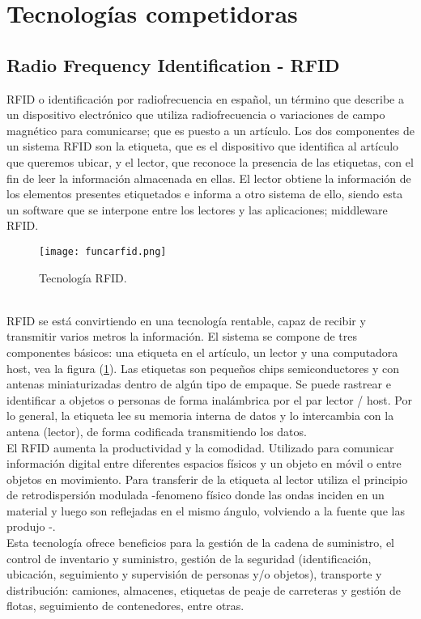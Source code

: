 \section{Tecnologías competidoras}

\subsection{Radio Frequency Identification - RFID}
RFID o identificación por radiofrecuencia en español, un término que describe a un dispositivo electrónico que utiliza radiofrecuencia o variaciones de campo magnético para comunicarse; que es puesto a un artículo. Los dos componentes de un sistema RFID son la etiqueta, que es el dispositivo que identifica al artículo que queremos ubicar, y el lector, que reconoce la presencia de las etiquetas,  con el fin de leer la información almacenada en ellas.
El lector obtiene la información de los elementos presentes etiquetados e informa a otro sistema de ello, siendo esta un software que se interpone entre los lectores y las aplicaciones;  middleware RFID. \cite{2006_BillGlover_BOOK}
\begin{figure} 	
	\centering
	\texttt{[image: funcarfid.png]}
	\caption{Tecnología RFID.}
	\label{fig:rfid}
\end{figure}
\\
RFID se está convirtiendo en una tecnología rentable, capaz de recibir y transmitir varios metros la información.\cite{2011_Coskun_BOOK} El sistema se compone de tres componentes básicos: una etiqueta en el artículo, un lector y una computadora host, vea la figura (\ref{fig:rfid}).  Las etiquetas son pequeños chips semiconductores y con antenas miniaturizadas dentro de algún tipo de empaque. Se puede rastrear e identificar a objetos o personas de forma inalámbrica por el par lector / host. \cite{2006_BillGlover_BOOK}
Por lo general, la etiqueta lee su memoria interna de datos y lo intercambia con la antena (lector), de forma codificada transmitiendo los datos.\cite{2005_Landt}
\\
El RFID aumenta la productividad y la comodidad. Utilizado para comunicar información digital entre diferentes espacios físicos y un objeto en móvil o entre objetos en movimiento. Para transferir de la etiqueta al lector utiliza el principio de retrodispersión modulada -fenomeno físico donde las ondas inciden en un material y luego son reflejadas en el mismo ángulo, volviendo a la fuente que las produjo -. \cite{2005_Landt}
\\
Esta tecnología ofrece beneficios para la gestión de la cadena de suministro, el control de inventario y suministro, gestión de la seguridad (identificación, ubicación, seguimiento y supervisión de personas y/o objetos), transporte y distribución: camiones, almacenes, etiquetas de peaje de carreteras y gestión de flotas, seguimiento de contenedores, entre otras.\cite{2007_Hunt_BOOK,2005_Weinstein}

